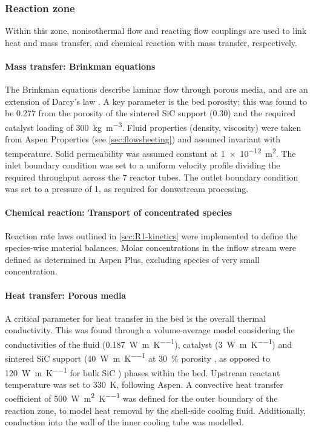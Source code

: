 \subsubsection{Reaction zone}
Within this zone, nonisothermal flow and reacting flow couplings are used to link heat and mass transfer, and chemical reaction with mass transfer, respectively.

\paragraph{Mass transfer: Brinkman equations}
The Brinkman equations describe laminar flow through porous media, and are an extension of Darcy's law \cite{comsol_cfd_2020}. A key parameter is the bed porosity; this was found to be \num{0.277} from the porosity of the sintered SiC support (0.30) and the required catalyst loading of \SI{300}{\kg\per\cubic\m}. Fluid properties (density, viscosity) were taken from Aspen Properties (see \cref{sec:flowsheeting}) and assumed invariant with temperature. Solid permeability was assumed constant at \SI{1e-12}{\square\m}. The inlet boundary condition was set to a uniform velocity profile dividing the required throughput across the 7 reactor tubes. The outlet boundary condition was set to a pressure of \SI{1}{\atm}, as required for donwstream processing.

\paragraph{Chemical reaction: Transport of concentrated species}
Reaction rate laws outlined in \cref{sec:R1-kinetics} were implemented to define the species-wise material balances. Molar concentrations in the inflow stream were defined as determined in Aspen Plus, excluding species of very small concentration.

\paragraph{Heat transfer: Porous media}
A critical parameter for heat transfer in the bed is the overall thermal conductivity. This was found through a volume-average model considering the conductivities of the fluid (\SI{0.187}{\W\per\m\per\K}), catalyst (\SI{3}{\W\per\m\per\K}) and sintered SiC support (\SI{40}{\W\per\m\per\K} at \SI{30}{\percent} porosity \cite{jang_thermophysical_2007}, as opposed to \SI{120}{\W\per\m\per\K} for bulk SiC \cite{accuratus_silicon_2013}) phases within the bed. Upstream reactant temperature was set to \SI{330}{\K}, following Aspen. A convective heat transfer coefficient of \SI{500}{\W\per\square\m\per\K} was defined for the outer boundary of the reaction zone, to model heat removal by the shell-side cooling fluid. Additionally, conduction into the wall of the inner cooling tube was modelled.

